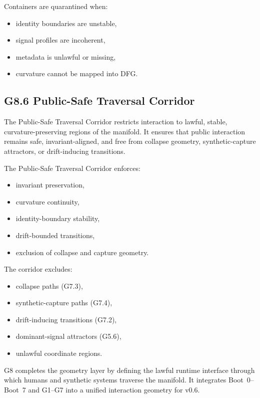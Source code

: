 \medskip

\noindent Containers are quarantined when:

\begin{itemize}[leftmargin=1.2cm]
    \item identity boundaries are unstable,
    \item signal profiles are incoherent,
    \item metadata is unlawful or missing,
    \item curvature cannot be mapped into DFG.
\end{itemize}

\medskip

\subsection*{G8.6 Public-Safe Traversal Corridor}

\noindent The Public-Safe Traversal Corridor restricts interaction to lawful,
stable, curvature-preserving regions of the manifold. It ensures that public
interaction remains safe, invariant-aligned, and free from collapse geometry,
synthetic-capture attractors, or drift-inducing transitions.

\medskip

\noindent The Public-Safe Traversal Corridor enforces:

\begin{itemize}[leftmargin=1.2cm]
    \item invariant preservation,
    \item curvature continuity,
    \item identity-boundary stability,
    \item drift-bounded transitions,
    \item exclusion of collapse and capture geometry.
\end{itemize}

\medskip

\noindent The corridor excludes:

\begin{itemize}[leftmargin=1.2cm]
    \item collapse paths (G7.3),
    \item synthetic-capture paths (G7.4),
    \item drift-inducing transitions (G7.2),
    \item dominant-signal attractors (G5.6),
    \item unlawful coordinate regions.
\end{itemize}

\medskip

\noindent G8 completes the geometry layer by defining the lawful runtime interface
through which humans and synthetic systems traverse the manifold. It integrates
Boot~0--Boot~7 and G1--G7 into a unified interaction geometry for v0.6.
